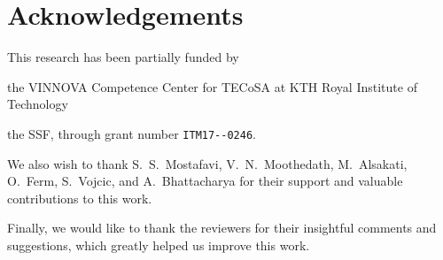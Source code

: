 \section*{Acknowledgements}\label{paper:olguinmunoz2022cleave:acks}

This research has been partially funded by
\begin{inlineenum}
    \item the VINNOVA Competence Center for \gls{TECoSA} at KTH Royal Institute of Technology
    \item the \gls{SSF}, through grant number \verb|ITM17--0246|.
\end{inlineenum}

We also wish to thank S.~S.~Mostafavi, V.~N.~Moothedath, M.~Alsakati, O.~Ferm, S.~Vojcic, and A.~Bhattacharya for their support and valuable contributions to this work.

Finally, we would like to thank the reviewers for their insightful comments and suggestions, which greatly helped us improve this work.
